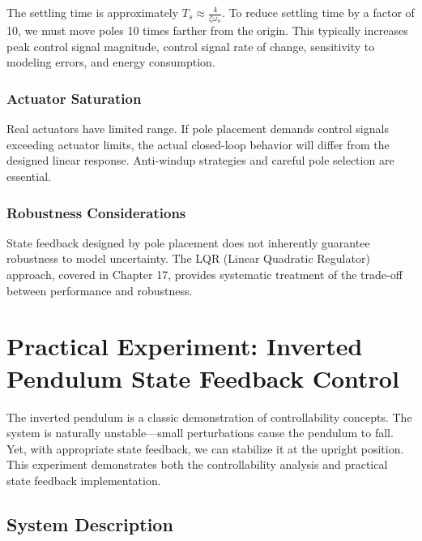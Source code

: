 The settling time is approximately $T_s \approx \frac{4}{\zeta\omega_n}$. To reduce settling time by a factor of 10, we must move poles 10 times farther from the origin. This typically increases peak control signal magnitude, control signal rate of change, sensitivity to modeling errors, and energy consumption.

\subsubsection{Actuator Saturation}

Real actuators have limited range. If pole placement demands control signals exceeding actuator limits, the actual closed-loop behavior will differ from the designed linear response. Anti-windup strategies and careful pole selection are essential.

\subsubsection{Robustness Considerations}

State feedback designed by pole placement does not inherently guarantee robustness to model uncertainty. The LQR (Linear Quadratic Regulator) approach, covered in Chapter 17, provides systematic treatment of the trade-off between performance and robustness.

\section{Practical Experiment: Inverted Pendulum State Feedback Control}

The inverted pendulum is a classic demonstration of controllability concepts. The system is naturally unstable---small perturbations cause the pendulum to fall. Yet, with appropriate state feedback, we can stabilize it at the upright position. This experiment demonstrates both the controllability analysis and practical state feedback implementation.

\subsection{System Description}

